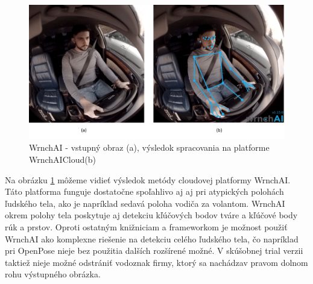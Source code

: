 \documentclass[slovak,master,dept460,male,cpp,cpdeclaration]{diploma}
\begin{document}
\begin{figure}[H]
	\centering
	\includegraphics[width=1\textwidth]{Figures/wrnchAI.png}
	\caption{WrnchAI - vstupný obraz (a), výsledok spracovania na platforme WrnchAICloud(b)}
	\label{fig:wrnchAICloud}
\end{figure}

Na obrázku \ref{fig:wrnchAICloud} môžeme vidieť výsledok metódy cloudovej platformy WrnchAI. Táto platforma  funguje dostatočne spoľahlivo aj aj pri atypických polohách ľudského tela, ako je napríklad sedavá poloha vodiča za volantom. WrnchAI okrem polohy tela poskytuje aj detekciu kľúčových bodov tváre a kľúčové body rúk a prstov. Oproti ostatným knižniciam a frameworkom je možnost použiť WrnchAI ako komplexne riešenie na detekciu celého ľudského tela, čo napríklad pri OpenPose nieje bez použitia dalších rozšírené možné. V skúšobnej trial verzii  taktiež nieje možné odstrániť vodoznak firmy, ktorý sa nachádzav pravom dolnom rohu výstupného obrázka.


\newpage
\end{document}
